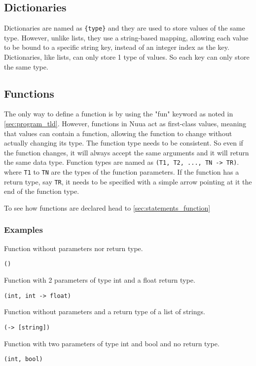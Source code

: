 \subsection{Dictionaries}

Dictionaries are named as \texttt{\{type\}} and they are used to store values of the same type. However, unlike lists, they
use a string-based mapping, allowing each value to be bound to a specific string key, instead of an integer index as the key.
Dictionaries, like lists, can only store 1 type of values. So each key can only store the same type.

\subsection{Functions}

The only way to define a function is by using the "fun" keyword as noted in \autoref{sec:program_tld}. However, functions in Nuua
act as first-class values, meaning that values can contain a function, allowing the function to change without actually changing its type.
The function type needs to be consistent. So even if the function changes, it will always accept the same arguments and it will return the same data type.
Function types are named as \texttt{(T1, T2, ..., TN -> TR)}. where \texttt{T1} to \texttt{TN} are the types of the function parameters.
If the function has a return type, say \texttt{TR}, it needs to be specified with a simple arrow pointing at it the end of the function type.

To see how functions are declared head to \autoref{sec:statements_function}

\subsubsection{Examples}

Function without parameters nor return type.
\begin{verbatim}
()
\end{verbatim}
\clearpage
Function with 2 parameters of type int and a float return type.
\begin{verbatim}
(int, int -> float)
\end{verbatim}
Function without parameters and a return type of a list of strings.
\begin{verbatim}
(-> [string])
\end{verbatim}
Function with two parameters of type int and bool and no return type.
\begin{verbatim}
(int, bool)
\end{verbatim}

